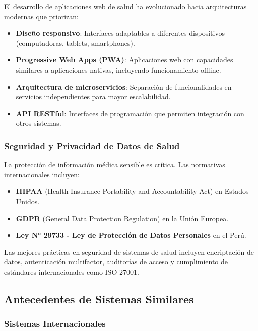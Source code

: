 \documentclass[12pt,a4paper]{article}
\begin{document}
El desarrollo de aplicaciones web de salud ha evolucionado hacia arquitecturas modernas que priorizan:

\begin{itemize}
    \item \textbf{Diseño responsivo}: Interfaces adaptables a diferentes dispositivos (computadoras, tablets, smartphones).
    \item \textbf{Progressive Web Apps (PWA)}: Aplicaciones web con capacidades similares a aplicaciones nativas, incluyendo funcionamiento offline.
    \item \textbf{Arquitectura de microservicios}: Separación de funcionalidades en servicios independientes para mayor escalabilidad.
    \item \textbf{API RESTful}: Interfaces de programación que permiten integración con otros sistemas.
\end{itemize}

\subsubsection{Seguridad y Privacidad de Datos de Salud}

La protección de información médica sensible es crítica. Las normativas internacionales incluyen:

\begin{itemize}
    \item \textbf{HIPAA} (Health Insurance Portability and Accountability Act) en Estados Unidos.
    \item \textbf{GDPR} (General Data Protection Regulation) en la Unión Europea.
    \item \textbf{Ley N° 29733 - Ley de Protección de Datos Personales} en el Perú.
\end{itemize}

Las mejores prácticas en seguridad de sistemas de salud incluyen encriptación de datos, autenticación multifactor, auditorías de acceso y cumplimiento de estándares internacionales como ISO 27001\cite{Fernandez2013}.

\subsection{Antecedentes de Sistemas Similares}

\subsubsection{Sistemas Internacionales}
\end{document}
